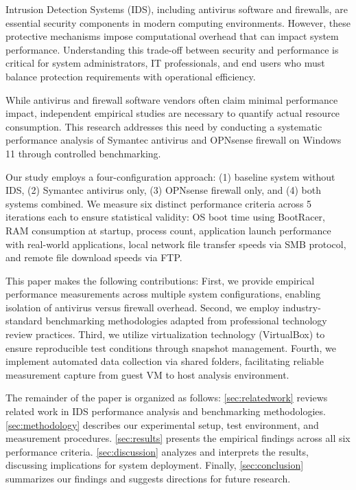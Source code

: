 \documentclass[runningheads,a4paper,english]{llncs}[2022/01/12]
\begin{document}
Intrusion Detection Systems (IDS), including antivirus software and firewalls, are essential security components in modern computing environments. However, these protective mechanisms impose computational overhead that can impact system performance. Understanding this trade-off between security and performance is critical for system administrators, IT professionals, and end users who must balance protection requirements with operational efficiency.

While antivirus and firewall software vendors often claim minimal performance impact, independent empirical studies are necessary to quantify actual resource consumption. This research addresses this need by conducting a systematic performance analysis of Symantec antivirus and OPNsense firewall on Windows 11 through controlled benchmarking.

Our study employs a four-configuration approach: (1) baseline system without IDS, (2) Symantec antivirus only, (3) OPNsense firewall only, and (4) both systems combined. We measure six distinct performance criteria across 5 iterations each to ensure statistical validity: OS boot time using BootRacer, RAM consumption at startup, process count, application launch performance with real-world applications, local network file transfer speeds via SMB protocol, and remote file download speeds via FTP.

This paper makes the following contributions: First, we provide empirical performance measurements across multiple system configurations, enabling isolation of antivirus versus firewall overhead. Second, we employ industry-standard benchmarking methodologies adapted from professional technology review practices. Third, we utilize virtualization technology (VirtualBox) to ensure reproducible test conditions through snapshot management. Fourth, we implement automated data collection via shared folders, facilitating reliable measurement capture from guest VM to host analysis environment.

The remainder of the paper is organized as follows: \cref{sec:relatedwork} reviews related work in IDS performance analysis and benchmarking methodologies. \cref{sec:methodology} describes our experimental setup, test environment, and measurement procedures. \cref{sec:results} presents the empirical findings across all six performance criteria. \cref{sec:discussion} analyzes and interprets the results, discussing implications for system deployment. Finally, \cref{sec:conclusion} summarizes our findings and suggests directions for future research.
\end{document}
